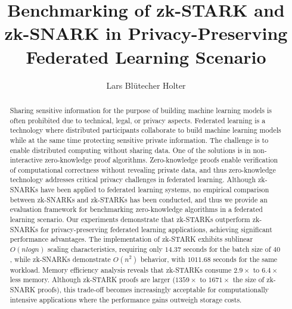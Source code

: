 \documentclass[runningheads]{llncs}
\begin{document}
%
\title{Benchmarking of zk-STARK and zk-SNARK in Privacy-Preserving Federated Learning Scenario}
%
%
\author{Lars Blütecher Holter}
%
%
%
\maketitle              %
%
\begin{abstract}
Sharing sensitive information for the purpose of building machine learning models is often prohibited due to technical, legal, or privacy aspects. Federated learning is a technology where distributed participants collaborate to build machine learning models while at the same time protecting sensitive private information. The challenge is to enable distributed computing without sharing data. One of the solutions is in non-interactive zero-knowledge proof algorithms. 
Zero-knowledge proofs enable verification of computational correctness without revealing private data, and thus zero-knowledge technology addresses critical privacy challenges in federated learning. 
Although zk-SNARKs have been applied to federated learning systems, no empirical comparison between zk-SNARKs and zk-STARKs has been conducted, and thus we provide an evaluation framework for benchmarking zero-knowledge algorithms in a federated learning scenario. Our experiments demonstrate that zk-STARKs outperform zk-SNARKs for privacy-preserving federated learning applications, achieving significant performance advantages.
The implementation of zk-STARK exhibits sublinear $O(n log n)$ scaling characteristics, requiring only $14.37$ seconds for the batch size of $40$, while zk-SNARKs demonstrate $O(n^{2})$ behavior, with $1011.68$ seconds for the same workload. Memory efficiency analysis reveals that zk-STARKs consume $2.9 \times$ to $6.4 \times$ less memory. 
Although zk-STARK proofs are larger ($1359 \times$ to $1671 \times$ the size of zk-SNARK proofs), this trade-off becomes increasingly acceptable for computationally intensive applications where the performance gains outweigh storage costs.

\end{abstract}
\end{document}
